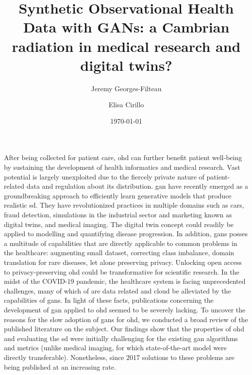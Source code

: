 \documentclass[10pt]{article}
\renewenvironment{abstract}
 {{\bfseries\noindent{\abstractname}\par\nobreak}\footnotesize}
 {\bigskip}
\begin{document}
    

    \title{Synthetic Observational Health Data with GANs: a Cambrian radiation in medical research and digital twins?}
    
    \author[1,2]{Jeremy Georges-Filteau}%
    \author[2]{Elisa Cirillo}%


    \vspace{-1em}

    \date{\today}

    \begingroup
    \let\center\flushleft
    \let\endcenter\endflushleft
    \maketitle
    \endgroup


    \glsresetall
    \begin{abstract}
    After being collected for patient care, \gls{ohd} can further benefit patient well-being by sustaining the development of health informatics and medical research. Vast potential is largely unexploited due to the fiercely private nature of patient-related data and regulation about its distribution. \gls{gan} have recently emerged as a groundbreaking approach to efficiently learn generative models that produce realistic \gls{sd}. They have revolutionized practices in multiple domains such as 
     cars, fraud detection, simulations in the industrial sector and marketing known as digital twins, and medical imaging. The digital twin concept could readily be applied to modelling and quantifying disease progression. In addition, \glspl{gan} posses a multitude of capabilities that are directly applicable to common problems in the healthcare: augmenting small dataset, correcting class imbalance, domain translation for rare diseases, let alone preserving privacy. Unlocking open access to privacy-preserving \gls{ohd} could be transformative for scientific research. In the midst of the COVID-19 pandemic, the healthcare system is facing unprecedented challenges, many of which of are data related and cloud be alleviated by the capabilities of \glspl{gan}. In light of these facts, publications concerning the development of  \gls{gan} applied to \gls{ohd} seemed to be severely lacking. To uncover the reasons for the slow adoption of \glspl{gan} for \gls{ohd}, we conducted a broad review of the published literature on the subject. Our findings show that the properties of \gls{ohd} and evaluating the \gls{sd} were initially challenging for the existing \gls{gan} algorithms and metrics (unlike medical imaging, for which state-of-the-art model were directly transferable). Nonetheless, since 2017 solutions to these problems are being published at an increasing rate.
    \end{abstract}

    
    
    
    
    
    

    \pagebreak

    \printglossary[type=oalgo]
    \printglossary[type=\acronymtype]

    \pagebreak

    
\end{document}
